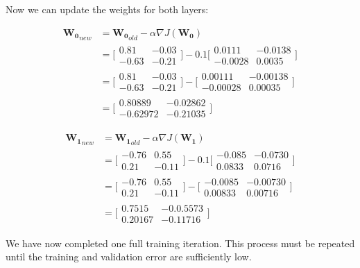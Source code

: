 \documentclass{article}
\begin{document}
Now we can update the weights for both layers:

\begin{align*}
   \mathbf{W_0}_{new} &= \mathbf{W_0}_{old} - \alpha \nabla J(\mathbf{W_0}) \\[0.5em]
   &= \bigg[\begin{matrix} 0.81 & -0.03 \\ -0.63 & -0.21 \end{matrix}\bigg] - 0.1\bigg[\begin{matrix} 0.0111 & -0.0138 \\ -0.0028 & 0.0035 \end{matrix}\bigg] \\[0.5em]
   &= \bigg[\begin{matrix} 0.81 & -0.03 \\ -0.63 & -0.21 \end{matrix}\bigg] - \bigg[\begin{matrix} 0.00111 & -0.00138 \\ -0.00028 & 0.00035 \end{matrix}\bigg] \\[0.5em]
   &= \bigg[\begin{matrix} 0.80889 & -0.02862 \\ -0.62972 & -0.21035 \end{matrix}\bigg]
\end{align*}

\begin{align*}
   \mathbf{W_1}_{new} &= \mathbf{W_1}_{old} - \alpha \nabla J(\mathbf{W_1}) \\[0.5em]
   &= \bigg[\begin{matrix} -0.76 & 0.55 \\ 0.21 & -0.11 \end{matrix}\bigg] - 0.1\bigg[\begin{matrix} -0.085 & -0.0730 \\ 0.0833 & 0.0716 \end{matrix}\bigg] \\[0.5em]
   &= \bigg[\begin{matrix} -0.76 & 0.55 \\ 0.21 & -0.11 \end{matrix}\bigg] - \bigg[\begin{matrix} -0.0085 & -0.00730 \\ 0.00833 & 0.00716 \end{matrix}\bigg] \\[0.5em]
   &= \bigg[\begin{matrix} 0.7515 & -0.0.5573\\ 0.20167 & -0.11716 \end{matrix}\bigg]
\end{align*}

We have now completed one full training iteration. This process must be repeated until the training and validation error are sufficiently low. 
\end{document}
